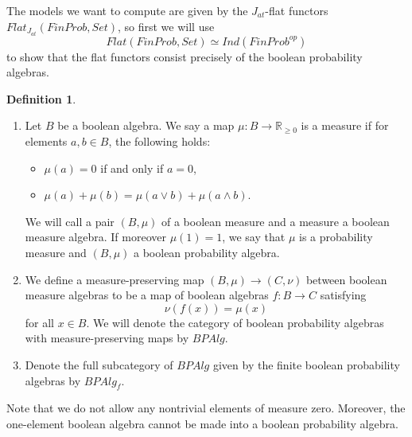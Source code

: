 \documentclass[a4paper]{amsproc}
\theoremstyle{plain}
\theoremstyle{definition}
\newtheorem{definition}[theorem]{Definition}
\theoremstyle{remark}
\numberwithin{equation}{section}
\begin{document}
The models we want to compute are given by the $J_{at}$-flat functors\linebreak
 $Flat_{J_{at}}(FinProb, Set)$, so first we will use 
\[
Flat(FinProb, Set) \simeq Ind(FinProb^{op})
\]
to show that the flat functors consist precisely of the boolean probability algebras.

\begin{definition}
\begin{enumerate}
\item Let $B$ be a boolean algebra. We say a map $\mu: B \to \mathbb{R}_{\geq 0}$ is a measure if for elements $a,b \in B$, the following holds:
\begin{itemize}
\item $\mu(a) = 0$ if and only if $a = 0 $,
\item $\mu(a) + \mu(b) = \mu(a \vee b) + \mu(a \wedge b)$.
\end{itemize}
We will call a pair $(B, \mu)$ of a boolean measure and a measure a boolean measure algebra. If moreover $\mu(1) = 1$, we say that $\mu$ is a  probability measure and $(B,\mu)$ a boolean probability algebra.
\item We define a measure-preserving map $(B, \mu) \to (C, \nu)$ between boolean measure algebras to be a map of boolean algebras $f: B \to C$ satisfying
\[
\nu(f(x)) = \mu(x)
\]
for all $x \in B$. We will denote the category of boolean probability algebras with measure-preserving maps by $BPAlg$.
\item Denote the full subcategory of $BPAlg$ given by the finite boolean probability algebras by $BPAlg_f$.
\end{enumerate}
\end{definition}


Note that we do not allow any nontrivial elements of measure zero. Moreover, the one-element boolean algebra cannot be made into a boolean probability algebra.
\end{document}
